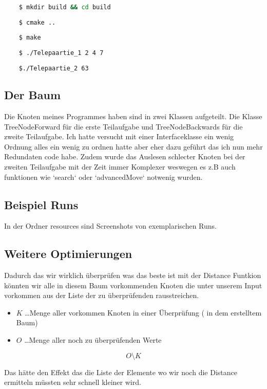 \documentclass{article}
\begin{document}
\begin{lstlisting}[language=Bash]
	
	$ mkdir build && cd build
	
	$ cmake ..
	
	$ make
	
	$ ./Telepaartie_1 2 4 7
	
	$./Telepaartie_2 63

\end{lstlisting}

\subsection*{ Der Baum }

Die Knoten meines Programmes haben sind in zwei Klassen aufgeteilt. Die Klasse TreeNodeForward für die erste Teilaufgabe und TreeNodeBackwards für die zweite Teilaufgabe. Ich hatte versucht mit einer Interfaceklasse ein wenig Ordnung alles ein wenig zu ordnen hatte aber eher dazu geführt das ich nun mehr Redundaten code habe. Zudem wurde das Auslesen  schlecter Knoten bei der zweiten Teilaufgabe mit der Zeit immer Komplexer weswegen es z.B auch funktionen wie `search` oder `advancedMove` notwenig wurden.

\subsection*{ Beispiel Runs}

In der Ordner resources sind Screenshots von exemplarischen Runs.

\subsection*{ Weitere Optimierungen}

Dadurch das wir wirklich überprüfen was das beste ist mit der Distance Funtkion könnten wir alle in diesem Baum vorkommenden Knoten die unter unserem Input vorkommen aus der Liste der zu überprüfenden rausstreichen. 

\newpage

\begin{itemize}
	\item \( K  \) \dots Menge aller vorkommen Knoten in einer Überprüfung ( in dem erstelltem Baum)
	\item \( O \) \dots Menge aller noch zu überprüfenden Werte
\end{itemize}

\begin{equation}
	O \setminus K
\end{equation}

Das hätte den Effekt das die Liste der Elemente wo wir noch die Distance ermitteln müssten sehr schnell kleiner wird.
\end{document}
